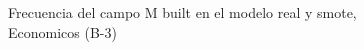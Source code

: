 \begin{figure}[H]
    \centering
    
    \caption{Frecuencia del campo M built en el modelo real y smote, Economicos (B-3)}
    \label{frecuency-M Built-smote-enc}
\end{figure}